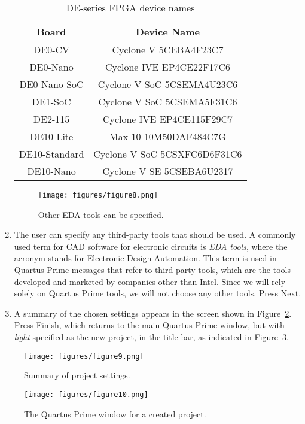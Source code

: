 \begin{enumerate}
\begin{table}[H]
	\begin{center}
	\begin{tabular}{| c | c |}
	\hline
	Board & Device Name \\
	\hline
	DE0-CV & Cyclone V 5CEBA4F23C7 \\
	\hline
	DE0-Nano & Cyclone IVE EP4CE22F17C6 \\
	\hline
	DE0-Nano-SoC & Cyclone V SoC 5CSEMA4U23C6\\
	\hline
	DE1-SoC & Cyclone V SoC 5CSEMA5F31C6 \\
	\hline
	DE2-115 & Cyclone IVE EP4CE115F29C7 \\
	\hline
	DE10-Lite & Max 10 10M50DAF484C7G \\
	\hline
	DE10-Standard & Cyclone V SoC 5CSXFC6D6F31C6 \\
	\hline
	DE10-Nano & Cyclone V SE 5CSEBA6U2317 \\
	\hline
	\end{tabular}
	\caption{DE-series FPGA device names}
	\label{tab:device}
	\end{center}
\end{table}

\begin{figure}[H]
   \begin{center}
      \texttt{[image: figures/figure8.png]}
   \caption{Other EDA tools can be specified.} 
	 \label{fig:8}
	 \end{center}
\end{figure}

\item The user can specify any third-party tools that should be used.
A commonly used term for CAD software for electronic circuits
is {\it EDA tools}, where the acronym stands for Electronic Design Automation.
This term is used in Quartus Prime messages that refer to third-party tools, 
which are the tools developed and marketed by companies other than Intel.
Since we will rely solely on Quartus Prime tools, we will not choose 
any other tools.  Press {\sf Next}.
 
\item A summary of the chosen settings appears in the screen shown in Figure~\ref{fig:9}.
Press {\sf Finish}, which returns to the main Quartus Prime window, 
but with {\it light} specified as the new project,
in the title bar, as indicated in Figure~\ref{fig:10}.
\end{enumerate}

\begin{figure}[H]
   \begin{center}
      \texttt{[image: figures/figure9.png]}
   \caption{Summary of project settings.} 
	 \label{fig:9}
	 \end{center}
\end{figure}

\begin{figure}[H]
   \begin{center}
      \texttt{[image: figures/figure10.png]}
   \caption{The Quartus Prime window for a created project.} 
	 \label{fig:10}
	 \end{center}
\end{figure}
